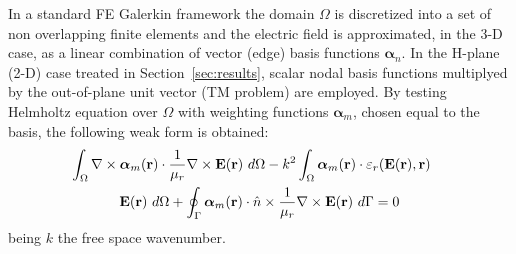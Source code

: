 \documentclass[journal,twoside]{IEEEtran}
\renewcommand{\vec}[1]{\mathbf{#1}}
\begin{document}
In a standard FE Galerkin framework the domain $\Omega$ is
discretized into a set of non overlapping finite elements and the electric
field is approximated, in the \mbox{3-D} case, as a linear combination of vector (edge) 
basis functions $\boldsymbol{\alpha}_n$. In the H-plane (\mbox{2-D}) case treated in
Section~\ref{sec:results}, 
scalar nodal basis functions multiplyed by the out-of-plane unit vector (TM problem) are employed.
%
%
By testing 
Helmholtz equation over $\Omega$ with weighting functions
$\boldsymbol{\alpha}_m$, chosen equal to the basis, the following weak form is
obtained:
%
\begin{multline}\label{eq:fem}
\hspace{-.4cm}\int_\Omega \nabla \times \boldsymbol{\alpha}_m (\vec{r}) \cdot \frac{1}{\mu_r}
\nabla \times \vec{E}(\vec{r}) \ d\Omega 
- k^2 \int_\Omega \boldsymbol{\alpha}_m (\vec{r}) \cdot \varepsilon_r 
(\vec{E}(\vec{r}), \vec{r})  \\ 
  \vec{E}(\vec{r}) \ d\Omega
+ \oint_{\Gamma} \boldsymbol{\alpha}_m (\vec{r}) \cdot \hat{n} \times 
\frac{1}{\mu_r} 
\nabla \times \vec{E}(\vec{r}) \ d\Gamma = 0
\end{multline} 
%
\noindent being $k$ the free space wavenumber. 
\end{document}
